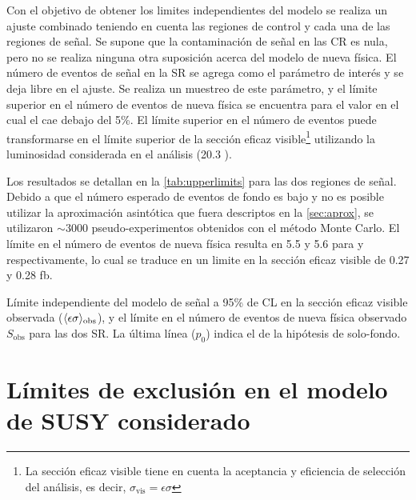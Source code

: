 Con el objetivo de obtener los limites independientes del modelo se realiza un
ajuste combinado teniendo en cuenta las regiones de control y cada una de las
regiones de señal. Se supone que la contaminación de señal en las CR es nula,
pero no se realiza ninguna otra suposición acerca del modelo de nueva física. El
número de eventos de señal en la SR se agrega como el parámetro de interés y se
deja libre en el ajuste. Se realiza un muestreo de este parámetro, y el
límite superior en el número de eventos de nueva física se encuentra para el
valor en el cual el {\cls} cae debajo del 5\%. El límite superior en el número
de eventos puede transformarse en el límite superior de la sección eficaz
visible\footnote{La sección eficaz visible tiene en cuenta
  la aceptancia y eficiencia de selección del análisis, es decir, $\sigma_{\text{vis}} = \epsilon\sigma$}
utilizando la luminosidad considerada en el análisis
(20.3 \ifb).

Los resultados se detallan en la \cref{tab:upperlimits} para las dos regiones de
señal. Debido a que el número esperado de eventos de fondo es bajo y no es
posible utilizar la aproximación asintótica que fuera descriptos en la \cref{sec:aprox},
se utilizaron $\sim 3000$
pseudo-experimentos obtenidos con el método Monte Carlo. El límite en el número
de eventos de nueva física resulta en 5.5 y 5.6 para {\SRL} y {\SRH}
respectivamente, lo cual se traduce en un limite en la sección eficaz visible de
0.27 y 0.28 fb.


\begin{table}[!htbp]
  \centering

  \caption{Límite independiente del modelo de señal a 95\% de CL en la
    sección eficaz visible observada ($\langle\epsilon{\rm \sigma}\rangle_{\rm obs}$),
    y el límite en el número de eventos de nueva física observado
    $S_\text{obs}$ para las dos SR.
    La última línea ($p_0$) indica el {\pvalue} de la hipótesis de solo-fondo.}
  \label{tab:upperlimits}

  

\end{table}


\clearpage

\section{Límites de exclusión en el modelo de SUSY considerado}
\label{sec:susy_limits}

